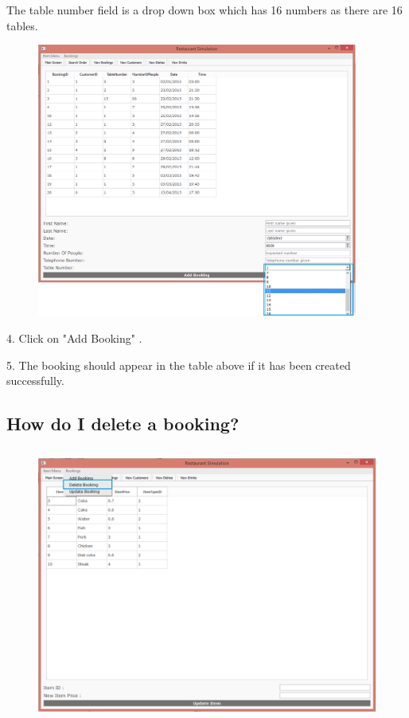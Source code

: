 The table number field is a drop down box which has 16 numbers as there are 16 tables.

\begin{figure}[H]
    \includegraphics[height = 9cm]{./Manual/images/AddBooking3} 
    \caption{} \label{fig:addbooking3}
\end{figure}

4. Click on "Add Booking" .

5. The booking should appear in the table above if it has been created successfully.

\subsection{How do I delete a booking?}


\begin{figure}[H]
    \includegraphics[height = 9cm]{./Manual/images/DeleteBooking1} 
    \caption{} \label{fig:deletebooking1}
\end{figure}


